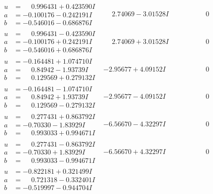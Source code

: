\documentclass[1p]{elsarticle_modified}
\theoremstyle{definition}
\begin{document}
$$\begin{array}{c|c|c}
\begin{aligned}
u &= \phantom{-}0.996431 + 0.423590 I \\
a &= -0.100176 - 0.242191 I \\
b &= -0.546016 - 0.686876 I\end{aligned}
 & \phantom{-}2.74069 - 3.01528 I & \phantom{-0.000000 } 0 \\ \hline\begin{aligned}
u &= \phantom{-}0.996431 - 0.423590 I \\
a &= -0.100176 + 0.242191 I \\
b &= -0.546016 + 0.686876 I\end{aligned}
 & \phantom{-}2.74069 + 3.01528 I & \phantom{-0.000000 } 0 \\ \hline\begin{aligned}
u &= -0.164481 + 1.074710 I \\
a &= \phantom{-}0.84942 - 1.93739 I \\
b &= \phantom{-}0.129569 + 0.279132 I\end{aligned}
 & -2.95677 + 4.09152 I & \phantom{-0.000000 } 0 \\ \hline\begin{aligned}
u &= -0.164481 - 1.074710 I \\
a &= \phantom{-}0.84942 + 1.93739 I \\
b &= \phantom{-}0.129569 - 0.279132 I\end{aligned}
 & -2.95677 - 4.09152 I & \phantom{-0.000000 } 0 \\ \hline\begin{aligned}
u &= \phantom{-}0.277431 + 0.863792 I \\
a &= -0.70330 - 1.83929 I \\
b &= \phantom{-}0.993033 + 0.994671 I\end{aligned}
 & -6.56670 - 4.32297 I & \phantom{-0.000000 } 0 \\ \hline\begin{aligned}
u &= \phantom{-}0.277431 - 0.863792 I \\
a &= -0.70330 + 1.83929 I \\
b &= \phantom{-}0.993033 - 0.994671 I\end{aligned}
 & -6.56670 + 4.32297 I & \phantom{-0.000000 } 0 \\ \hline\begin{aligned}
u &= -0.822181 + 0.321499 I \\
a &= \phantom{-}0.721318 - 0.332401 I \\
b &= -0.519997 - 0.944704 I\end{aligned}

\end{array}$$
\end{document}
